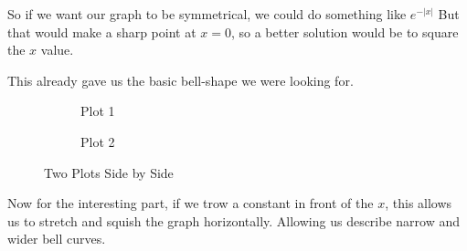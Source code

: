 \documentclass[11pt]{article}
\begin{document}
So if we want our graph to be symmetrical, we could do something like
\(e^{-|x|}\)
But that would make a sharp point at \(x=0\), so a better solution would be to
square the \(x\) value.

This already gave us the basic bell-shape we were looking for.

\begin{figure}
  \centering
  \begin{subfigure}[b]{0.45\textwidth}
    \caption{Plot 1}
    \label{fig:plot1}
  \end{subfigure}
  \hfill
  \begin{subfigure}[b]{0.45\textwidth}
    \caption{Plot 2}
    \label{fig:plot2}
  \end{subfigure}
  \caption{Two Plots Side by Side}
  \label{fig:plots}
\end{figure}




Now for the interesting part, if we trow a constant in front of the \(x\), this allows us to stretch and
squish the graph horizontally. Allowing us describe narrow and wider
bell curves.  
\end{document}
